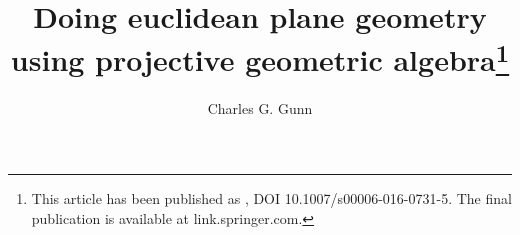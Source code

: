 \documentclass{birkjour}
\begin{document}
\ifthenelse{\equal{\isBJ}{false}}{

\title{Doing euclidean plane geometry\\using projective geometric algebra}%
\author{Charles G. Gunn } %
}
{
\title{Doing euclidean plane geometry\\using projective geometric algebra\footnote{This article has been published as \cite{gunn2016b}, DOI 10.1007/s00006-016-0731-5.  The final publication is available at link.springer.com.}}%
\author{Charles G. Gunn}
\address{ Instit\"{u}t f\"{u}r Mathematik  MA 8-3\\
Technische Universit\"{a}t Berlin\\
Str. des 17 Juni 136\\
10623 Berlin Germany\\
\\
Charles G. Gunn\\Raum+Gegenraum \\  Brieselanger Weg 1 \\ 14612 Falkensee Germany  }
}
\maketitle
\end{document}
